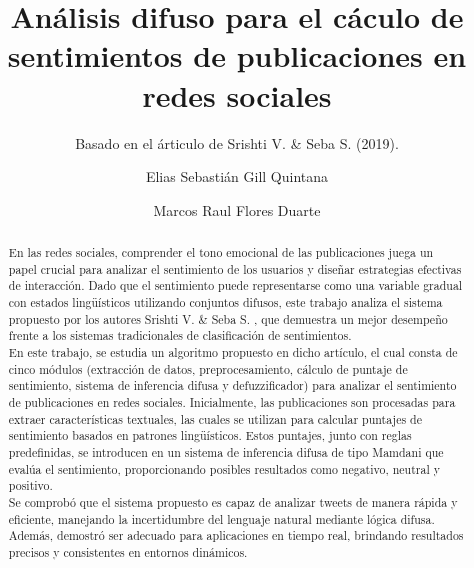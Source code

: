 \documentclass[sigconf, review=false, nonacm]{acmart}
\begin{document}
\title{Análisis difuso para el cáculo de sentimientos de publicaciones en redes sociales} \subtitle{Basado en
	el árticulo de Srishti V. \& Seba S. (2019).}

\author{Elias Sebastián Gill Quintana}

\author{Marcos Raul Flores Duarte}


\begin{abstract}
	En las redes sociales, comprender el tono emocional de las publicaciones juega un papel crucial para
	analizar el sentimiento de los usuarios y diseñar estrategias efectivas de interacción. Dado que el
	sentimiento puede representarse como una variable gradual con estados lingüísticos utilizando conjuntos
	difusos, este trabajo analiza el sistema propuesto por los autores Srishti V. \& Seba S. \cite{paper}, que
	demuestra un mejor desempeño frente a los sistemas tradicionales de clasificación de sentimientos.\\

	En este trabajo, se estudia un algoritmo propuesto en dicho artículo, el cual consta de cinco módulos
	(extracción de datos, preprocesamiento, cálculo de puntaje de sentimiento, sistema de inferencia difusa y
	defuzzificador) para analizar el sentimiento de publicaciones en redes sociales. Inicialmente, las
	publicaciones son procesadas para extraer características textuales, las cuales se utilizan para calcular
	puntajes de sentimiento basados en patrones lingüísticos. Estos puntajes, junto con reglas predefinidas,
	se introducen en un sistema de inferencia difusa de tipo Mamdani que evalúa el sentimiento, proporcionando
	posibles resultados como negativo, neutral y positivo.\\

	Se comprobó que el sistema propuesto es capaz de analizar tweets de manera rápida y eficiente, manejando
	la incertidumbre del lenguaje natural mediante lógica difusa. Además, demostró ser adecuado para
	aplicaciones en tiempo real, brindando resultados precisos y consistentes en entornos dinámicos.
\end{abstract}
\end{document}
